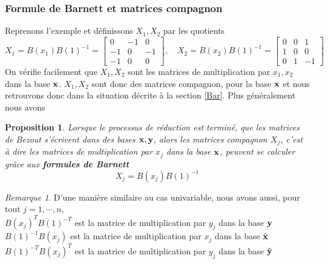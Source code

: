 \documentclass{article}
\theoremstyle{plain}%
\newtheorem{prop}{Proposition}
\theoremstyle{definition}
\theoremstyle{remark}
\newtheorem*{rem}{Remarque}
\begin{document}
\subsubsection{Formule de Barnett et matrices compagnon}
Reprenons l'exemple \label{ex_bez_multi} et définissons $X_1, X_2$ par les quotients
\begin{equation}
	X_1 = B(x_1)B(1)^{-1} = 
	\begin{bmatrix}
		0 & -1 & 0\\
		-1 & 0 & -1\\
		-1 & 0 & 0
	\end{bmatrix},\quad
	X_2 = B(x_2)B(1)^{-1} = 
	\begin{bmatrix}
		0 & 0 & 1\\
		1 & 0 & 0\\
		0 & 1 & -1
	\end{bmatrix}
\end{equation}
On vérifie facilement que $X_1, X_2$ sont les matrices de multiplication par $x_1, x_2$ dans la base $\bold{x}$. $X_1, X_2$ sont donc des matrices compagnon, pour la base $\bold{x}$ et nous retrouvons donc dans la situation décrite à la section \ref{Bar}. Plus généralement nous avons 
\begin{prop}
\label{Barnett_multi}
Lorsque le processus de réduction est terminé, que les matrices de Bezout s'écrivent dans des bases $\bold{x, y}$, alors les matrices compagnon $X_j$, c'est à dire les matrices de multiplication par $x_j$ dans la base $\bold{x}$, peuvent se calculer grâce aux {\bf formules de Barnett}
\begin{equation}
	X_j = B(x_j)B(1)^{-1}
\end{equation}
\end{prop}

\begin{rem}
D'une manière similaire au cas univariable, nous avons aussi, pour tout $j=1,\cdots,n$,\\
$B(x_j)^{T}B(1)^{-T}$ est la matrice de multiplication par $y_j$ dans la base $\bold{y}$ \\
$B(1)^{-1}B(x_j)$ est la matrice de multiplication par $x_j$ dans la base $\hat{\bold{x}}$ \\
$B(1)^{-T}B(x_j)^{T}$ est la matrice de multiplication par $y_j$ dans la base $\hat{\bold{y}}$
\end{rem}
\end{document}
